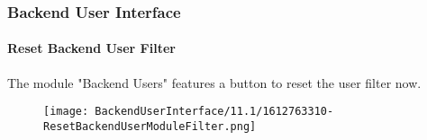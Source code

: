 %

\begin{frame}[fragile]
	\frametitle{Backend User Interface}
	\framesubtitle{Reset Backend User Filter}

	The module "Backend Users" features a button to reset the user filter now.

	\begin{figure}
		\texttt{[image: BackendUserInterface/11.1/1612763310-ResetBackendUserModuleFilter.png]}
	\end{figure}

\end{frame}

